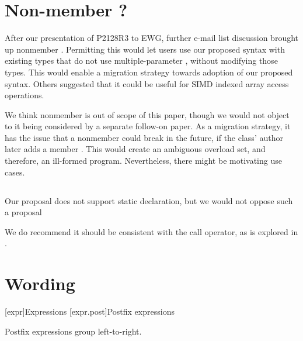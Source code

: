 \documentclass{wg21}
\begin{document}
\section{Non-member ?}

After our presentation of P2128R3 to EWG, further e-mail list discussion brought up nonmember .  Permitting this would let users use our proposed  syntax with existing types that do not use multiple-parameter , without modifying those types.  This would enable a migration strategy towards adoption of our proposed syntax.  Others suggested that it could be useful for SIMD indexed array access operations.

We think nonmember  is out of scope of this paper, though we would not object to it being considered by a separate follow-on paper.  As a migration strategy, it has the issue that a nonmember  could break in the future, if the class' author later adds a member .  This would create an ambiguous overload set, and therefore, an ill-formed program.  Nevertheless, there might be motivating use cases.

\subsection{}

Our proposal does not support static 
declaration, but we would not oppose such a proposal

We do recommend it should be consistent
with the call operator, as is explored in .



\section{Wording}

[expr]{Expressions}
[expr.post]{Postfix expressions}%

\pnum
Postfix expressions group left-to-right.
\end{document}
